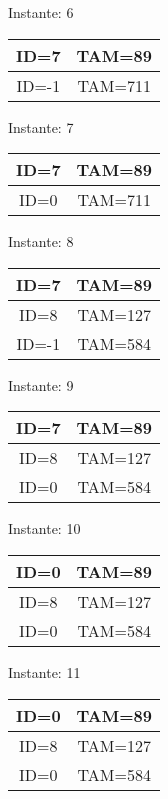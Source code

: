 \documentclass[10pt,a4paper]{article}
\begin{document}
\begin{center}

Instante: 6

\begin{tabular}{|c|c|}
\hline
ID=7 & TAM=89 \\ \hline
ID=-1 & TAM=711 \\ \hline
\end{tabular}
\end{center}\pagebreak
\begin{center}

Instante: 7

\begin{tabular}{|c|c|}
\hline
ID=7 & TAM=89 \\ \hline
ID=0 & TAM=711 \\ \hline
\end{tabular}
\end{center}\pagebreak
\begin{center}

Instante: 8

\begin{tabular}{|c|c|}
\hline
ID=7 & TAM=89 \\ \hline
ID=8 & TAM=127 \\ \hline
ID=-1 & TAM=584 \\ \hline
\end{tabular}
\end{center}\pagebreak
\begin{center}

Instante: 9

\begin{tabular}{|c|c|}
\hline
ID=7 & TAM=89 \\ \hline
ID=8 & TAM=127 \\ \hline
ID=0 & TAM=584 \\ \hline
\end{tabular}
\end{center}\pagebreak
\begin{center}

Instante: 10

\begin{tabular}{|c|c|}
\hline
ID=0 & TAM=89 \\ \hline
ID=8 & TAM=127 \\ \hline
ID=0 & TAM=584 \\ \hline
\end{tabular}
\end{center}\pagebreak
\begin{center}

Instante: 11

\begin{tabular}{|c|c|}
\hline
ID=0 & TAM=89 \\ \hline
ID=8 & TAM=127 \\ \hline
ID=0 & TAM=584 \\ \hline
\end{tabular}
\end{center}\pagebreak
\end{document}
